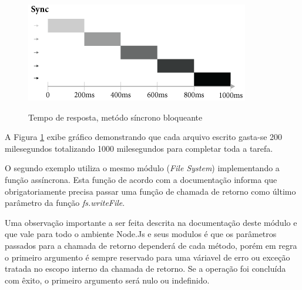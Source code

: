   \begin{figure}[H]
    \setlength{\abovecaptionskip}{0pt}
    \setlength{\belowcaptionskip}{0pt}
    \caption[Tempo de resposta, metódo síncrono bloqueante]{Tempo de resposta, metódo síncrono bloqueante}
    \centering
    \includegraphics[width=.85\textwidth]{imagem/timeline-node-sync-caio-ribeiro.png}
    \captionsetup{justification=centering}
    \label{fig:timeline-sync}
  \end{figure}
  
  A Figura \ref{fig:timeline-sync} exibe gráfico demonstrando que cada arquivo escrito
  gasta-se 200 milesegundos totalizando 1000 milesegundos para completar toda a tarefa.

  O segundo exemplo utiliza o mesmo módulo (\textit{File System}) implementando a função assíncrona. Esta função de acordo com
  a documentação \cite{ModuleSystemFs:2014} informa que obrigatoriamente precisa passar uma função de chamada de retorno como último
  parâmetro da função \textit{fs.writeFile}.
  

  Uma observação importante a ser feita descrita na documentação deste módulo e que 
  vale para todo o ambiente Node.Js e seus modulos é que os parâmetros passados para a chamada de retorno dependerá de 
  cada método, porém em regra   o primeiro argumento é sempre reservado para uma váriavel de erro ou exceção tratada no 
  escopo interno da chamada de retorno.
  Se a operação foi concluída com êxito, o primeiro argumento será nulo ou indefinido. \cite{ModuleSystemFs:2014}

